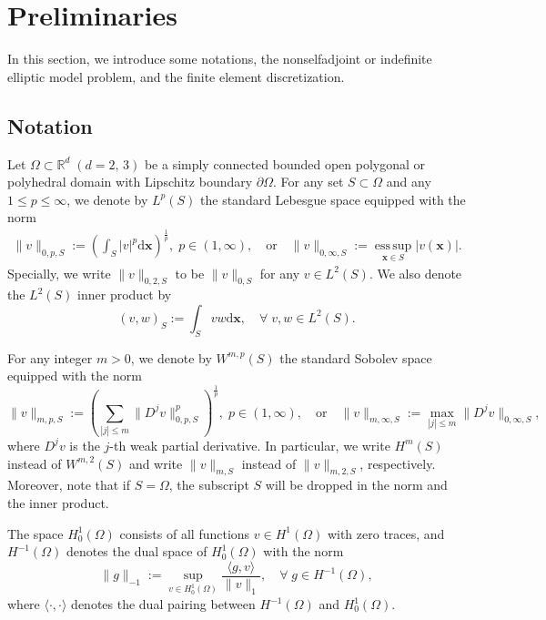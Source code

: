 \documentclass[preprint,times]{elsarticle}%
\numberwithin{algorithm}{section}
\numberwithin{equation}{section}
\newcommand{\vx}{\boldsymbol{x}}
\newcommand{\mbR}{\mathbb{R}}
\newcommand{\mrd}{\mathrm{d}}
\def\leq{\leqslant}
\DeclareMathOperator*{\esssup}{ess\,sup}
\begin{document}
\section{Preliminaries}\label{part-preliminary}
In this section, we introduce some notations, the nonselfadjoint or indefinite elliptic model problem, and the finite element discretization. 

\subsection{Notation}
Let $\Omega \subset \mbR^d \; (d = 2, \, 3)$ be a simply connected bounded open polygonal or polyhedral domain with Lipschitz boundary $\partial \Omega$. For any set $S \subset \Omega$ and any $1 \leq p \leq \infty$, 
we denote by $L^p(S)$ the standard Lebesgue space equipped with the norm 
\begin{align*}
	\|v\|_{0,p,S} := \left(\int_S |v|^p \mrd \vx \right)^\frac{1}{p}, \; p \in (1,\infty), \quad \text{or} \quad \|v\|_{0,\infty,S}:=\esssup\limits_{\vx \in S}|v(\vx)|. 
\end{align*}
Specially, we write $\|v\|_{0,2,S}$ to be $\|v\|_{0,S}$ for any $v \in L^2(S)$. We also denote the $L^2(S)$ inner product by 
\begin{equation*}
	(v,w)_S := \int_S vw \mrd \vx, \quad \forall \; v,w \in L^2(S). 
\end{equation*}

For any integer $m > 0$, we denote by $W^{m,p}(S)$ the standard Sobolev space equipped with the norm 
\begin{equation*}
	\|v\|_{m,p,S} := \left(\sum_{|j| \leq m}\|D^j v\|^p_{0,p,S}\right)^\frac{1}{p}, \; p \in (1,\infty), \quad \text{or} \quad \|v\|_{m,\infty,S}:=\max_{|j| \leq m}\|D^j v\|_{0,\infty,S}, 
\end{equation*}
where $D^j v$ is the $j$-th weak partial derivative. 
In particular, we write $H^m(S)$  instead of $W^{m,2}(S)$ and write  $\|v\|_{m,S}$  instead of $\|v\|_{m,2,S}$, respectively. Moreover, note that if $S = \Omega$, the subscript $S$ will be dropped in the norm and the inner product. 

The space $H_0^1(\Omega)$ consists of all functions $v \in H^1(\Omega)$ with zero traces, and $H^{-1}(\Omega)$ denotes the dual space of $H_0^1(\Omega)$ with the norm 
	\begin{equation}\label{def-negative-norm}
		\|g\|_{-1} := \sup_{v \in H_0^1(\Omega)}\frac{\langle g,v \rangle}{\|v\|_1}, \quad \forall \; g \in H^{-1}(\Omega), 
	\end{equation}
where $\langle \cdot,\cdot \rangle$ denotes the dual pairing between $H^{-1}(\Omega)$ and $H_0^1(\Omega)$. 
\end{document}
